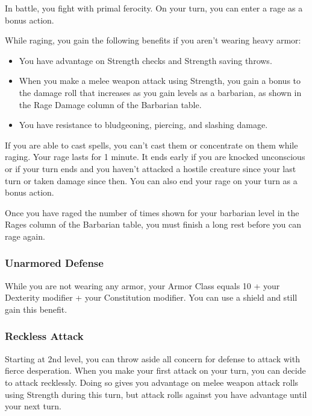 In battle, you fight with primal ferocity. On your turn, you can enter a
rage as a bonus action.

While raging, you gain the following benefits if you aren't wearing
heavy armor:

\begin{itemize}
\item
  You have advantage on Strength checks and Strength saving throws.
\item
  When you make a melee weapon attack using Strength, you gain a bonus
  to the damage roll that increases as you gain levels as a barbarian,
  as shown in the Rage Damage column of the Barbarian table.
\item
  You have resistance to bludgeoning, piercing, and slashing damage.
\end{itemize}

If you are able to cast spells, you can't cast them or concentrate on
them while raging. Your rage lasts for 1 minute. It ends early if you
are knocked unconscious or if your turn ends and you haven't attacked a
hostile creature since your last turn or taken damage since then. You
can also end your rage on your turn as a bonus action.

Once you have raged the number of times shown for your barbarian level
in the Rages column of the Barbarian table, you must finish a long rest
before you can rage again.

\hypertarget{unarmored-defense}{%
\subsubsection{Unarmored Defense}\label{unarmored-defense}}

While you are not wearing any armor, your Armor Class equals 10 + your
Dexterity modifier + your Constitution modifier. You can use a shield
and still gain this benefit.

\hypertarget{reckless-attack}{%
\subsubsection{Reckless Attack}\label{reckless-attack}}

Starting at 2nd level, you can throw aside all concern for defense to
attack with fierce desperation. When you make your first attack on your
turn, you can decide to attack recklessly. Doing so gives you advantage
on melee weapon attack rolls using Strength during this turn, but attack
rolls against you have advantage until your next turn.

